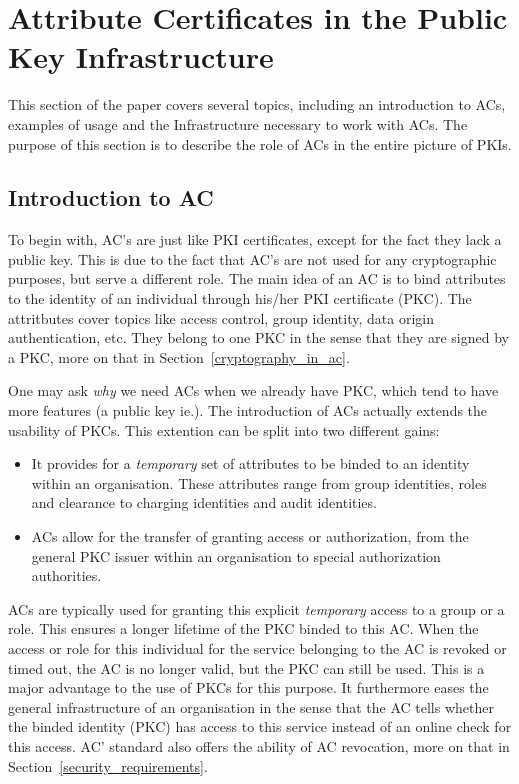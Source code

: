 \documentclass[10pt,conference,a4paper]{IEEEtran}
\begin{document}
\section{Attribute Certificates in the Public Key Infrastructure}
\label{ac_in_pki}
This section of the paper covers several topics, including an introduction to ACs, examples of usage and the Infrastructure necessary to work with  ACs. The purpose of this section is to describe the role of ACs in the entire picture of PKIs.
\subsection{Introduction to AC}
To begin with, AC's are just like PKI certificates, except for the fact they lack a public key. This is due to the fact that AC's are not used for any cryptographic purposes, but serve a different role. The main idea of an AC is to bind attributes to the identity of an individual through his/her PKI certificate (PKC). The attritbutes cover topics like access control, group identity, data origin authentication, etc. They belong to one PKC in the sense that they are signed by a PKC, more on that in Section~\ref{cryptography_in_ac}.

One may ask \textit{why} we need ACs when we already have PKC, which tend to have more features (a public key ie.). The introduction of ACs actually extends the usability of PKCs. This extention can be split into two different gains:
\begin{itemize}
	\item It provides for a \textit{temporary} set of attributes to be binded to an identity within an organisation. These attributes range from group identities, roles and clearance to charging identities and audit identities. 
	\item ACs allow for the transfer of granting access or authorization, from the general PKC issuer within an organisation to special authorization authorities.
\end{itemize}

ACs are typically used for granting this explicit \textit{temporary} access to a group or a role. This ensures a longer lifetime of the PKC binded to this AC. When the access or role for this individual for the service belonging to the AC is revoked or timed out, the AC is no longer valid, but the PKC can still be used. This is a major advantage to the use of PKCs for this purpose. It furthermore eases the general infrastructure of an organisation in the sense that the AC tells whether the binded identity (PKC) has access to this service instead of an online check for this access. AC' standard also offers the ability of AC revocation, more on that in Section~\ref{security_requirements}.
\end{document}

